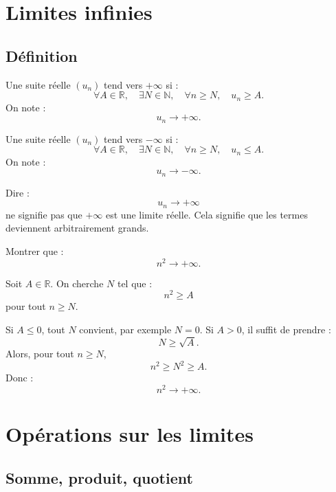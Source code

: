 \documentclass[11pt,a4paper]{article}
\newcommand{\N}{\mathbb N}
\newcommand{\R}{\mathbb R}
\begin{document}
\section{Limites infinies}

\subsection{Définition}

\begin{definitionbox}
Une suite réelle \((u_n)\) tend vers \(+\infty\) si :
\[
\forall A\in\R,\quad \exists N\in\N,\quad \forall n\geq N,\quad u_n\geq A.
\]
On note :
\[
u_n\to+\infty.
\]
\end{definitionbox}

\begin{definitionbox}
Une suite réelle \((u_n)\) tend vers \(-\infty\) si :
\[
\forall A\in\R,\quad \exists N\in\N,\quad \forall n\geq N,\quad u_n\leq A.
\]
On note :
\[
u_n\to-\infty.
\]
\end{definitionbox}

\begin{retenirbox}
Dire :
\[
u_n\to+\infty
\]
ne signifie pas que \(+\infty\) est une limite réelle.  
Cela signifie que les termes deviennent arbitrairement grands.
\end{retenirbox}

\begin{exercicebox}
Montrer que :
\[
n^2\to+\infty.
\]
\end{exercicebox}

\begin{correctionbox}
Soit \(A\in\R\).  
On cherche \(N\) tel que :
\[
n^2\geq A
\]
pour tout \(n\geq N\).

Si \(A\leq0\), tout \(N\) convient, par exemple \(N=0\).  
Si \(A>0\), il suffit de prendre :
\[
N\geq \sqrt A.
\]
Alors, pour tout \(n\geq N\),
\[
n^2\geq N^2\geq A.
\]
Donc :
\[
n^2\to+\infty.
\]
\end{correctionbox}

\section{Opérations sur les limites}

\subsection{Somme, produit, quotient}
\end{document}
